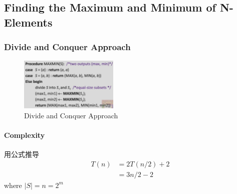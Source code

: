 \subsection[Finding the Maximum and Minimum]{Finding the Maximum and Minimum of N-Elements}

\subsubsection{Divide and Conquer Approach}
\begin{figure}[!htb]
    \centering
    \includegraphics[width=0.42\textwidth]{pic/DAA2/Divide and Conquer Approach}
    \caption{Divide and Conquer Approach}
\end{figure}

\paragraph{Complexity}用公式推导 
\begin{align*}
    T(n)&=2T(n/2)+2\\
    &=3n/2-2
\end{align*}
where $|S|=n=2^m$


